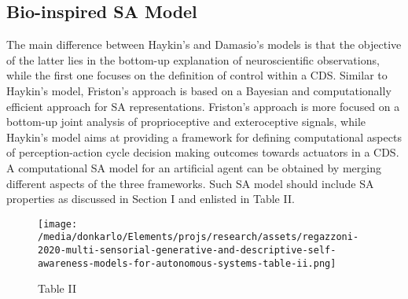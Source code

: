 \documentclass{article}
\begin{document}
		\subsection{Bio-inspired SA Model}
		The main difference between Haykin’s and Damasio’s models is that the objective of the latter lies in the bottom-up
		explanation of neuroscientific observations, while the first one
		focuses on the definition of control within a CDS. Similar
		to Haykin’s model, Friston’s approach is based on a Bayesian
		and computationally efficient approach for SA representations.
		Friston’s approach is more focused on a bottom-up joint analysis of proprioceptive and exteroceptive signals, while Haykin’s
		model aims at providing a framework for defining computational aspects of perception-action cycle decision making
		outcomes towards actuators in a CDS. A computational SA
		model for an artificial agent can be obtained by merging
		different aspects of the three frameworks. Such SA model
		should include SA properties as discussed in Section I and
		enlisted in \cite{regazzoni-2020-multi-sensorial-generative-and-descriptive-self-awareness-models-for-autonomous-systems}Table II.
		\begin{figure*}
			\centering
			\texttt{[image: /media/donkarlo/Elements/projs/research/assets/regazzoni-2020-multi-sensorial-generative-and-descriptive-self-awareness-models-for-autonomous-systems-table-ii.png]}
			\caption{\cite{regazzoni-2020-multi-sensorial-generative-and-descriptive-self-awareness-models-for-autonomous-systems} Table II}
			\label{fig:regazzoni-2020-multi-sensorial-generative-and-descriptive-self-awareness-models-for-autonomous-systems-table-ii.png}
		\end{figure*}
\end{document}

